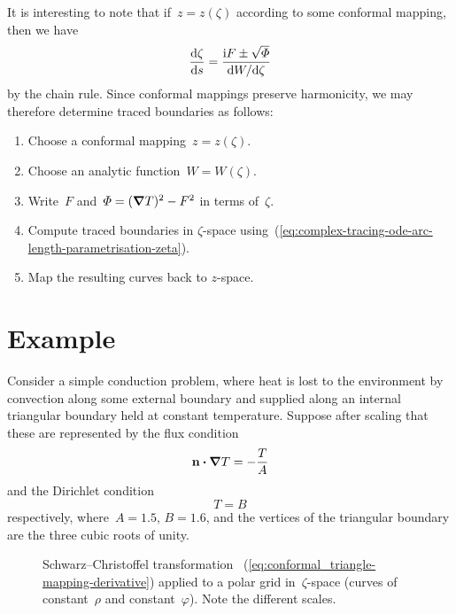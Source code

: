 It is interesting to note that
if~$z = z (\zeta)$ according to some conformal mapping,
then we have
\begin{equation}
  \tder{\zeta}{s} = \frac{\ii F \pm \sqrt{\Phi}}{\td W / {\td\zeta}}
  \label{eq:complex-tracing-ode-arc-length-parametrisation-zeta}
\end{equation}
by the chain rule.
Since conformal mappings preserve harmonicity,
we may therefore determine traced boundaries as follows:
\begin{enumerate}
  \tightlist
  \item
    Choose a conformal mapping~$z = z (\zeta)$.
  \item
    Choose an analytic function~$W = W (\zeta)$.
  \item
    Write~$F$ and~$\varPhi = (\mathop{}\!\boldsymbol{\mathbf{\nabla}} T)^2 - F^2$ in terms of~$\zeta$.
  \item
    Compute traced boundaries in $\zeta$-space
    using~(\ref{eq:complex-tracing-ode-arc-length-parametrisation-zeta}).
  \item
    Map the resulting curves back to $z$-space.
\end{enumerate}

\section{Example}
\label{sec:complex.example}

Consider a simple conduction problem,
where heat is lost to the environment
by convection along some external boundary
and supplied along an internal triangular boundary
held at constant temperature.
Suppose after scaling that these are represented
by the flux condition
\begin{equation}
  \mathop{}\!\boldsymbol{\mathbf{n}} \boldsymbol{\cdot} \mathop{}\!\boldsymbol{\mathbf{\nabla}} T = -\frac{T}{A}
  \label{eq:example-flux-boundary-condition}
\end{equation}
and the Dirichlet condition
\begin{equation}
  T = B
  \label{eq:example-dirichlet-condition}
\end{equation}
respectively,
where~$A = 1.5$, $B = 1.6$,
and the vertices of the triangular boundary
are the three cubic roots of unity.

\begin{figure}
  \newcommand*{\subfigurewidth}{0.47\textwidth}
  \begin{subfigure}[t]{\subfigurewidth}
  \end{subfigure}
    \hfill
  \begin{subfigure}[t]{\subfigurewidth}
  \end{subfigure}
  \caption{
    Schwarz--Christoffel transformation~%
      (\ref{eq:conformal_triangle-mapping-derivative})
    applied to a polar grid in~$\zeta$-space
    (curves of constant~$\rho$ and constant~$\varphi$).
    Note the different scales.
  }
  \label{fig:conformal_triangle-grid}
\end{figure}

